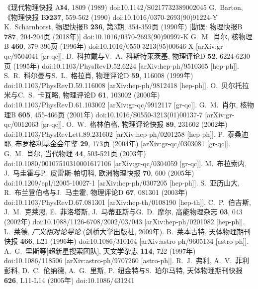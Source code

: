 \documentclass[jkps,preprint,fleqn]{revtex4}
\begin{document}
\begin{CJK*}{UTF8}{gbsn}
\begin{thebibliography}{999}
《现代物理快报 A》\textbf{4}, 1809 (1989)
doi:10.1142/S0217732389002045
G.~Barton,
《物理快报 B》\textbf{237}, 559-562 (1990)
doi:10.1016/0370-2693(90)91224-Y
K.~Scharnhorst,
物理快报B \textbf{236}, 第3期, 354-359页 (1990年)
[勘误: 物理快报B \textbf{787}, 204-204页 (2018年)]
doi:10.1016/0370-2693(90)90997-K
G.~M.~肖尔,
核物理B \textbf{460}, 379-396页 (1996年)
doi:10.1016/0550-3213(95)00646-X
[arXiv:gr-qc/9504041 [gr-qc]].
D.~科拉戴与V.~A.~科斯特莱茨基,
物理评论D \textbf{52}, 6224-6230页 (1995年)
doi:10.1103/PhysRevD.52.6224
[arXiv:hep-ph/9510365 [hep-ph]].
S.~R.~科尔曼与S.~L.~格拉肖,
物理评论D \textbf{59}, 116008 (1999年)
doi:10.1103/PhysRevD.59.116008
[arXiv:hep-ph/9812418 [hep-ph]].
O.~贝尔托拉米与C.~S.~卡瓦略,
物理评论D \textbf{61}, 103002 (2000年)
doi:10.1103/PhysRevD.61.103002
[arXiv:gr-qc/9912117 [gr-qc]].
G.~M.~肖尔,
核物理B \textbf{605}, 455-466页 (2001年)
doi:10.1016/S0550-3213(01)00137-7
[arXiv:gr-qc/0012063 [gr-qc]].
O.~W.~格林伯格,
物理评论快报 \textbf{89}, 231602 (2002年)
doi:10.1103/PhysRevLett.89.231602
[arXiv:hep-ph/0201258 [hep-ph]].
P.~泰桑迪耶,
布罗格利基金会年鉴 \textbf{29}, 173页 (2004年)
[arXiv:gr-qc/0303081 [gr-qc]].
G.~M.~肖尔,
当代物理 \textbf{44}, 503-521页 (2003年)
doi:10.1080/00107510310001617106
[arXiv:gr-qc/0304059 [gr-qc]].
M.~布拉索内, J.~马圭霍与P.~皮雷斯-帕切科,
欧洲物理快报 \textbf{70}, 600 (2005年)
doi:10.1209/epl/i2005-10027-1
[arXiv:hep-ph/0307205 [hep-ph]].
S.~亚历山大, R.~布兰登伯格与J.~马圭霍,
物理评论D \textbf{67}, 081301 (2003年)
doi:10.1103/PhysRevD.67.081301
[arXiv:hep-th/0108190 [hep-th]].
C.~P.~伯吉斯, J.~M.~克莱恩, E.~菲洛塔斯, J.~马蒂亚斯与G.~D.~摩尔,
高能物理杂志 \textbf{03}, 043 (2002年)
doi:10.1088/1126-6708/2002/03/043
[arXiv:hep-ph/0201082 [hep-ph]].
 L.~莱德, \textit{广义相对论导论} (剑桥大学出版社, 2009年).
B.~莱本古特,
天体物理期刊快报 \textbf{466}, L21 (1996年)
doi:10.1086/310164
[arXiv:astro-ph/9605134 [astro-ph]].
A.~G.~里斯等[超新星搜索团队],
天文学杂志 \textbf{114}, 722 (1997年)
doi:10.1086/118506
[arXiv:astro-ph/9707260 [astro-ph]].
R.~J.~弗利, A.~V.~菲利彭科, D.~C.~伦纳德, A.~G.~里斯, P.~纽金特与S.~珀尔马特,
天体物理期刊快报 \textbf{626}, L11-L14 (2005年)
doi:10.1086/431241

\end{thebibliography}
\end{CJK*}
\end{document}
